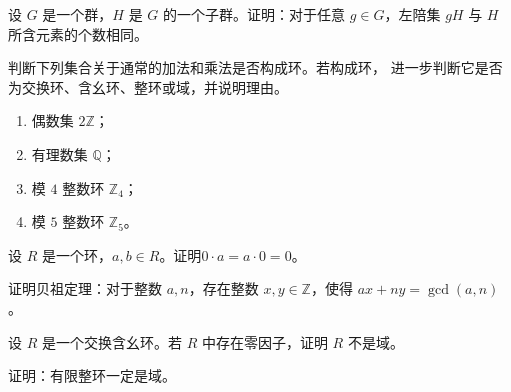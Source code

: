 \begin{exercise}
    设 \(G\) 是一个群，\(H\) 是 \(G\) 的一个子群。证明：对于任意 \(g\in G\)，左陪集 \(gH\) 与 \(H\) 所含元素的个数相同。
\end{exercise}

\begin{exercise}
    判断下列集合关于通常的加法和乘法是否构成环。若构成环，
    进一步判断它是否为交换环、含幺环、整环或域，并说明理由。
    \begin{enumerate}
        \item 偶数集 \(2\mathbb Z\)；
        \item 有理数集 \(\mathbb Q\)；
        \item 模 \(4\) 整数环 \(\mathbb Z_4\)；
        \item 模 \(5\) 整数环 \(\mathbb Z_5\)。
    \end{enumerate}
\end{exercise}

\begin{exercise}
    设 \(R\) 是一个环，\(a,b\in R\)。证明\( 0 \cdot a=a \cdot 0=0 \)。
\end{exercise}

\begin{exercise}
    证明贝祖定理：对于整数 \(a,n\)，存在整数 \(x, y \in \mathbb{Z} \)，使得 \(ax+ny=\gcd(a,n)\)。
\end{exercise}

\begin{exercise}
    设 \(R\) 是一个交换含幺环。若 \(R\) 中存在零因子，证明 \(R\) 不是域。
\end{exercise}

\begin{exercise}
    证明：有限整环一定是域。
\end{exercise}
